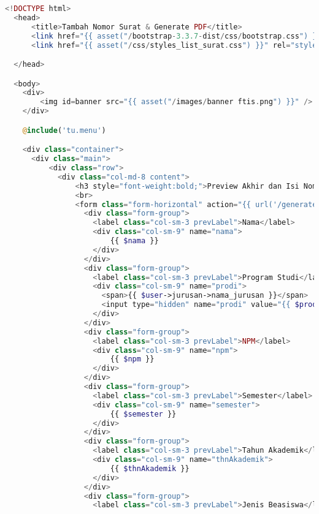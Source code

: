 \begin{lstlisting}[language=php,basicstyle=\tiny,caption=Tambah nomor surat untuk surat keterangan beasiswa]
	<!DOCTYPE html>
  <head>
      <title>Tambah Nomor Surat & Generate PDF</title>
      <link href="{{ asset("/bootstrap-3.3.7-dist/css/bootstrap.css") }}" rel="stylesheet" type="text/css" />
      <link href="{{ asset("/css/styles_list_surat.css") }}" rel="stylesheet" type="text/css">

  </head>

  <body>
    <div>
        <img id=banner src="{{ asset("/images/banner ftis.png") }}" />
    </div>

    @include('tu.menu')

    <div class="container">
      <div class="main">
          <div class="row">
            <div class="col-md-8 content">
                <h3 style="font-weight:bold;">Preview Akhir dan Isi Nomor Surat</h3>
                <br>
                <form class="form-horizontal" action="{{ url('/generatePDF') }}" method="post">
                  <div class="form-group">
                    <label class="col-sm-3 prevLabel">Nama</label>
                    <div class="col-sm-9" name="nama">
                        {{ $nama }}
                    </div>
                  </div>
                  <div class="form-group">
                    <label class="col-sm-3 prevLabel">Program Studi</label>
                    <div class="col-sm-9" name="prodi">
                      <span>{{ $user->jurusan->nama_jurusan }}</span>
                      <input type="hidden" name="prodi" value="{{ $prodi }}"/>
                    </div>
                  </div>
                  <div class="form-group">
                    <label class="col-sm-3 prevLabel">NPM</label>
                    <div class="col-sm-9" name="npm">
                        {{ $npm }}
                    </div>
                  </div>
                  <div class="form-group">
                    <label class="col-sm-3 prevLabel">Semester</label>
                    <div class="col-sm-9" name="semester">
                        {{ $semester }}
                    </div>
                  </div>
                  <div class="form-group">
                    <label class="col-sm-3 prevLabel">Tahun Akademik</label>
                    <div class="col-sm-9" name="thnAkademik">
                        {{ $thnAkademik }}
                    </div>
                  </div>
                  <div class="form-group">
                    <label class="col-sm-3 prevLabel">Jenis Beasiswa</label>

\end{lstlisting}
